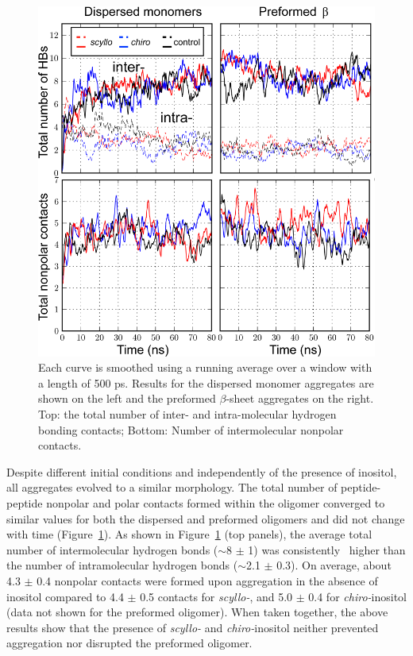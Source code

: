 \begin{figure}[htbp]
  \centering
  \includegraphics[width=4.5in]{figures/results1/GA4_paper_figures_submitted-5}
  \caption[Time evolution of peptide-peptide nonpolar and hydrogen bonding contacts in disordered aggregates in presence and absence of inositol (control).]{Each curve is smoothed using a running average over a window with a length of 500 ps. Results for the dispersed monomer aggregates are shown on the left and the preformed $\beta$-sheet aggregates on the right. Top: the total number of inter- and intra-molecular hydrogen bonding contacts; Bottom: Number of intermolecular nonpolar contacts.}
   \label{fig:figure5}
\end{figure}
  
Despite different initial conditions and independently of the presence of inositol, all aggregates evolved to a similar morphology. The total number of peptide-peptide nonpolar and polar contacts formed within the oligomer converged to similar values for both the dispersed and preformed oligomers and did not change with time (Figure~\ref{fig:figure5}). As shown in Figure~\ref{fig:figure5} (top panels), the average total number of intermolecular hydrogen bonds ($\sim$8 $\pm$ 1) was consistently \bbridge\ higher than the number of intramolecular hydrogen bonds ($\sim$2.1 $\pm$ 0.3). On average, about 4.3 $\pm$ 0.4 nonpolar contacts were formed upon aggregation in the absence of inositol compared to 4.4 $\pm$ 0.5 contacts for \textit{scyllo-}, and 5.0 $\pm$ 0.4 for \textit{chiro-}inositol (data not shown for the preformed oligomer). When taken together, the above results show that the presence of \textit{scyllo-} and \textit{chiro-}inositol neither prevented aggregation nor disrupted the preformed oligomer.

